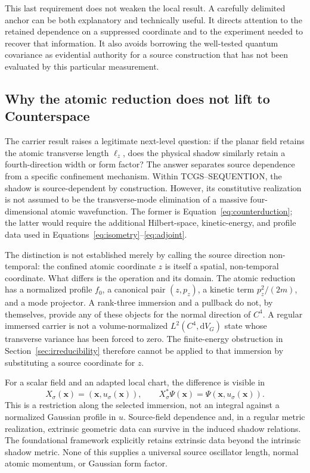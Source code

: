 \documentclass[11pt,a4paper]{article}
\theoremstyle{definition}
\theoremstyle{remark}
\newcommand{\TCGS}{TCGS--SEQUENTION}
\newcommand{\dd}{\mathrm{d}}
\newcommand{\lop}{\ell_z}
\begin{document}
This last requirement does not weaken the local result. A carefully delimited anchor can be both explanatory and technically useful. It directs attention to the retained dependence on a suppressed coordinate and to the experiment needed to recover that information. It also avoids borrowing the well-tested quantum covariance as evidential authority for a source construction that has not been evaluated by this particular measurement.

\subsection{Why the atomic reduction does not lift to Counterspace}
\label{sec:source_disanalogy}
The carrier result raises a legitimate next-level question: if the planar field retains the atomic transverse length $\lop$, does the physical shadow similarly retain a fourth-direction width or form factor? The answer separates source dependence from a specific confinement mechanism. Within \TCGS, the shadow is source-dependent by construction. However, its constitutive realization is not assumed to be the transverse-mode elimination of a massive four-dimensional atomic wavefunction. The former is Equation~\eqref{eq:counterduction}; the latter would require the additional Hilbert-space, kinetic-energy, and profile data used in Equations~\eqref{eq:isometry}--\eqref{eq:adjoint}.\cite{foundation,logical}

The distinction is not established merely by calling the source direction non-temporal: the confined atomic coordinate $z$ is itself a spatial, non-temporal coordinate. What differs is the operation and its domain. The atomic reduction has a normalized profile $f_0$, a canonical pair $(z,p_z)$, a kinetic term $p_z^2/(2m)$, and a mode projector. A rank-three immersion and a pullback do not, by themselves, provide any of these objects for the normal direction of $C^4$. A regular immersed carrier is not a volume-normalized $L^2(C^4,\dd V_G)$ state whose transverse variance has been forced to zero. The finite-energy obstruction in Section~\ref{sec:irreducibility} therefore cannot be applied to that immersion by substituting a source coordinate for $z$.\cite{foundation,planck}

For a scalar field and an adapted local chart, the difference is visible in
\[
 X_\sigma(\boldsymbol x)=(\boldsymbol x,u_\sigma(\boldsymbol x)),
 \qquad X_\sigma^*\Psi(\boldsymbol x)
 =\Psi(\boldsymbol x,u_\sigma(\boldsymbol x)).
\]
This is a restriction along the selected immersion, not an integral against a normalized Gaussian profile in $u$. Source-field dependence and, in a regular metric realization, extrinsic geometric data can survive in the induced shadow relations. The foundational framework explicitly retains extrinsic data beyond the intrinsic shadow metric. None of this supplies a universal source oscillator length, normal atomic momentum, or Gaussian form factor.\cite{foundation}
\end{document}
